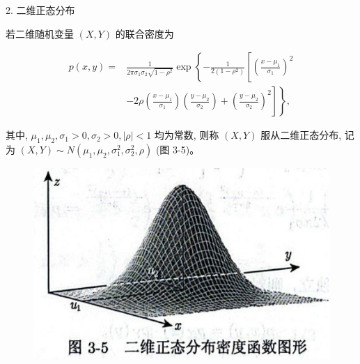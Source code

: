 \documentclass{beamer}
\begin{document}
	\begin{frame}
		2. 二维正态分布
		
		若二维随机变量 $(X, Y)$ 的联合密度为
		
		$$
		\begin{aligned}
			p(x, y)= & \frac{1}{2 \pi \sigma_{1} \sigma_{2} \sqrt{1-\rho^{2}}} \exp \left\{-\frac{1}{2\left(1-\rho^{2}\right)}\left[\left(\frac{x-\mu_{1}}{\sigma_{1}}\right)^{2}\right.\right. \\
			& \left.\left.-2 \rho\left(\frac{x-\mu_{1}}{\sigma_{1}}\right)\left(\frac{y-\mu_{2}}{\sigma_{2}}\right)+\left(\frac{y-\mu_{2}}{\sigma_{2}}\right)^{2}\right]\right\},
		\end{aligned}
		$$
		
		其中, $\mu_{1}, \mu_{2}, \sigma_{1}>0, \sigma_{2}>0,|\rho|<1$ 均为常数, 则称 $(X, Y)$ 服从二维正态分布, 记为 $(X, Y) \sim N\left(\mu_{1}, \mu_{2}, \sigma_{1}^{2}, \sigma_{2}^{2}, \rho\right)$ (图 3-5)。
	\end{frame}
	
	\begin{frame}
		\begin{figure}
			\centering
			\includegraphics[scale = 0.3]{figures/figure3-5.png}
		\end{figure}
	\end{frame}
	
\end{document}
